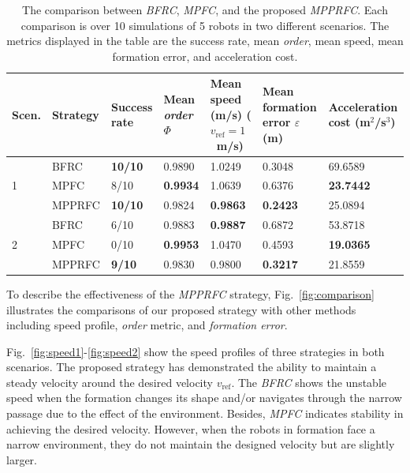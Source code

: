 \begin{table}
\centering
\caption{The comparison between \textit{BFRC}, \textit{MPFC}, and the proposed \textit{MPPRFC}. Each comparison is over 10 simulations of 5 robots in two
different scenarios. The metrics displayed in the table are
the success rate, mean \textit{order}, mean speed, mean formation error, and acceleration cost.}
\label{tbl:analys}
\begin{tabular}{C{1.0cm}C{1.4cm}C{1.8cm}C{1.8cm}C{2.5cm}C{2.3cm}C{2.0cm}}
\hline \hline
Scen.             & Strategy & Success rate  & Mean \textit{order} $\Phi$ & Mean speed (m/s) ($v_\text{ref}=1$~m/s) & Mean formation error $\varepsilon$ (m) & Acceleration cost (m$^2$/s$^3$) \\ \hline
{} & BFRC      & \textbf{10/10} & 0.9890     & 1.0249     & 0.3048               & 69.6589    \\
                     & MPFC     & 8/10  & \textbf{0.9934}     & 1.0639     & 0.6376               & \textbf{23.7442}    \\
                     & MPPRFC    & \textbf{10/10} & 0.9824     & \textbf{0.9863}     & \textbf{0.2423}               & 25.0894    \\ \hline
{}   & BFRC      & 6/10  & 0.9883     & \textbf{0.9887}     & 0.6872               & 53.8718    \\
                     & MPFC     & 0/10  & \textbf{0.9953}     & 1.0470      & 0.4593               & \textbf{19.0365}    \\
                     & MPPRFC    & \textbf{9/10}  & 0.9830     & 0.9800       & \textbf{0.3217}               & 21.8559   \\ \hline \hline
\end{tabular}
\end{table}

To describe the effectiveness of the \textit{MPPRFC} strategy, Fig.~\ref{fig:comparison} illustrates the comparisons of our proposed strategy with other methods including speed profile, \textit{order} metric, and \textit{formation error}. 

Fig.~\ref{fig:speed1}-\ref{fig:speed2} show the speed profiles of three strategies in both scenarios. The proposed strategy has demonstrated the ability to maintain a steady velocity around the desired velocity $v_\text{ref}$. The \textit{BFRC} shows the unstable speed when the formation changes its shape and/or navigates through the narrow passage due to the effect of the environment. Besides, \textit{MPFC} indicates stability in achieving the desired velocity. However, when the robots in formation face a narrow environment, they do not maintain the designed velocity but are slightly larger.

